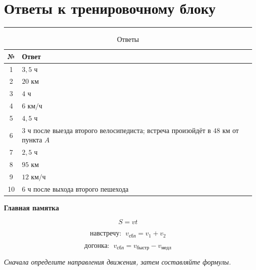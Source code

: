 \documentclass[a4paper,12pt]{article}
\newcommand{\km}{\text{ км}}
\newcommand{\kmh}{\text{ км/ч}}
\newcommand{\hour}{\text{ ч}}
\newcommand{\sectionline}{
    \vspace{-0.2em}
    {\color{linegray}\rule{\linewidth}{0.5pt}}
    \vspace{0.5em}
}
\begin{document}

\clearpage

\section*{\textcolor{darkaccent}{Ответы к тренировочному блоку}}

\sectionline

\begin{table}[h!]
\centering
\caption{Ответы}
\renewcommand{\arraystretch}{1.45}
\begin{tabularx}{0.92\linewidth}{cX}
\toprule
\textbf{№} & \textbf{Ответ}\\
\midrule

1 &
\(3{,}5\hour\)
\\

2 &
\(20\km\)
\\

3 &
\(4\hour\)
\\

4 &
\(6\kmh\)
\\

5 &
\(4{,}5\hour\)
\\

6 &
\(3\hour\) после выезда второго велосипедиста;
встреча произойдёт в \(48\km\) от пункта \(A\)
\\

7 &
\(2{,}5\hour\)
\\

8 &
\(95\km\)
\\

9 &
\(12\kmh\)
\\

10 &
\(6\hour\) после выхода второго пешехода
\\

\bottomrule
\end{tabularx}
\end{table}

\vfill

\begin{center}
\textcolor{darkaccent}{
\textbf{Главная памятка}
}

\vspace{0.5em}

\[
\boxed{S=vt}
\]

\[
\boxed{
\text{навстречу: }\;
v_{\text{сбл}}=v_1+v_2
}
\]

\[
\boxed{
\text{догонка: }\;
v_{\text{сбл}}=v_{\text{быстр}}-v_{\text{медл}}
}
\]

\vspace{0.8em}

\textit{
Сначала определите направления движения,
затем составляйте формулы.
}

\end{center}
\end{document}
